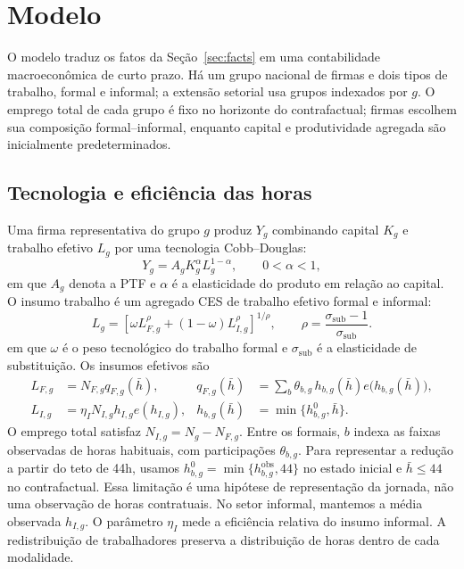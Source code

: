 \section{Modelo}\label{sec:model}

O modelo traduz os fatos da Seção~\ref{sec:facts} em uma contabilidade macroeconômica de curto prazo. Há um grupo nacional de firmas e dois tipos de trabalho, formal e informal; a extensão setorial usa grupos indexados por $g$. O emprego total de cada grupo é fixo no horizonte do contrafactual; firmas escolhem sua composição formal--informal, enquanto capital e produtividade agregada são inicialmente predeterminados.

\subsection{Tecnologia e eficiência das horas}

Uma firma representativa do grupo $g$ produz $Y_g$ combinando capital $K_g$ e trabalho efetivo $L_g$ por uma tecnologia Cobb--Douglas:
\begin{equation}\label{eq:production}
Y_g=A_g K_g^\alpha L_g^{1-\alpha},\qquad 0<\alpha<1,
\end{equation}
em que $A_g$ denota a PTF e $\alpha$ é a elasticidade do produto em relação ao capital. O insumo trabalho é um agregado CES de trabalho efetivo formal e informal:
\begin{equation}\label{eq:ces}
L_g=\left[\omega L_{F,g}^{\rho}+(1-\omega)L_{I,g}^{\rho}\right]^{1/\rho},
\qquad \rho=\frac{\sigma_{\mathrm{sub}}-1}{\sigma_{\mathrm{sub}}}.
\end{equation}
em que $\omega$ é o peso tecnológico do trabalho formal e $\sigma_{\mathrm{sub}}$ é a elasticidade de substituição. Os insumos efetivos são
\begin{align}
L_{F,g}&=N_{F,g}q_{F,g}(\bar h), &
q_{F,g}(\bar h)&=\sum_b\theta_{b,g}\,h_{b,g}(\bar h)e\bigl(h_{b,g}(\bar h)\bigr),\label{eq:effective_formal}\\
L_{I,g}&=\eta_I N_{I,g}h_{I,g}e(h_{I,g}), &
h_{b,g}(\bar h)&=\min\{h_{b,g}^{0},\bar h\}.
\end{align}
O emprego total satisfaz $N_{I,g}=N_g-N_{F,g}$. Entre os formais, $b$ indexa as faixas observadas de horas habituais, com participações $\theta_{b,g}$. Para representar a redução a partir do teto de 44h, usamos $h_{b,g}^{0}=\min\{h_{b,g}^{\mathrm{obs}},44\}$ no estado inicial e $\bar h\leq44$ no contrafactual. Essa limitação é uma hipótese de representação da jornada, não uma observação de horas contratuais. No setor informal, mantemos a média observada $h_{I,g}$. O parâmetro $\eta_I$ mede a eficiência relativa do insumo informal. A redistribuição de trabalhadores preserva a distribuição de horas dentro de cada modalidade.

